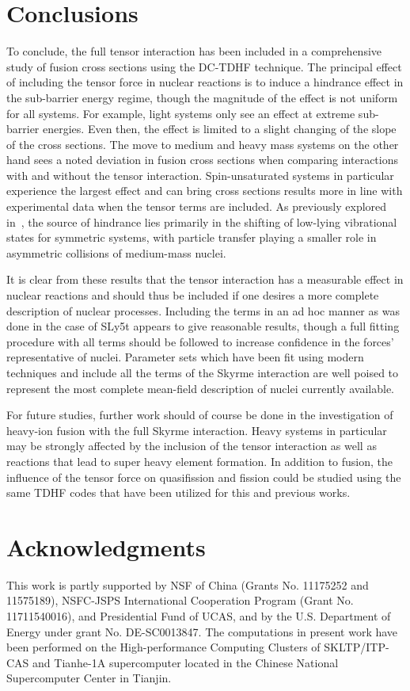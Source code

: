 \documentclass[aps,prc,twocolumn,showpacs,superscriptaddress,longbibliography,floatfix,10pt]{revtex4-1}
\begin{document}
\section{Conclusions}

To conclude, the full tensor interaction has been included in a comprehensive study of fusion cross sections using the DC-TDHF technique.
The principal effect of including the tensor force in nuclear reactions is to induce a hindrance effect in the sub-barrier energy regime, though the magnitude of the effect is not uniform for all systems.
For example, light systems only see an effect at extreme sub-barrier energies.
Even then, the effect is limited to a slight changing of the slope of the cross sections.
The move to medium and heavy mass systems on the other hand sees a noted deviation in fusion cross sections when comparing interactions with and without the tensor interaction.
Spin-unsaturated systems in particular experience the largest effect and can bring cross sections results more in line with experimental data when the tensor terms are included.
As previously explored in~\cite{guo2018}, the source of hindrance lies primarily in the shifting of low-lying vibrational states for symmetric systems, with particle transfer playing a smaller role in asymmetric collisions of medium-mass nuclei.

It is clear from these results that the tensor interaction has a measurable effect in nuclear reactions and should thus be included if one desires a more complete description of nuclear processes.
Including the terms in an ad hoc manner as was done in the case of SLy5t appears to give reasonable results, though a full fitting procedure with all terms should be followed to increase confidence in the forces' representative of nuclei.
Parameter sets which have been fit using modern techniques and include all the terms of the Skyrme interaction are well poised to represent the most complete mean-field description of nuclei currently available.

For future studies, further work should of course be done in the investigation of heavy-ion fusion with the full Skyrme interaction.
Heavy systems in particular may be strongly affected by the inclusion of the tensor interaction as well as reactions that lead to super heavy element formation.
In addition to fusion, the influence of the tensor force on quasifission and fission could be studied using the same TDHF codes that have been utilized for this and previous works.


\label{summary}

\section{Acknowledgments}
This work is partly supported by NSF of China (Grants No. 11175252 and 11575189),
NSFC-JSPS International Cooperation Program (Grant No. 11711540016), and Presidential Fund of UCAS,
and by the U.S. Department of Energy under grant No. DE-SC0013847.
The computations in present work have been performed on the High-performance Computing Clusters of SKLTP/ITP-CAS and
Tianhe-1A supercomputer located in the Chinese National Supercomputer Center in Tianjin.

%

\end{document}
